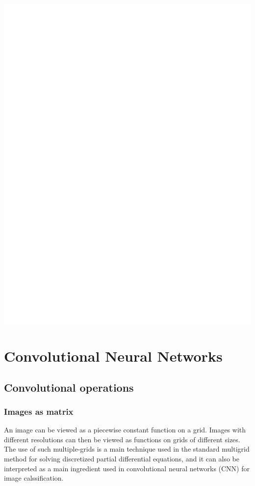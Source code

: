 \documentclass[10pt]{article}
\begin{document}
\includegraphics[max width=\textwidth]{2022_01_06_b5ce182ed1bd5f482e5bg-02}

\section{Convolutional Neural Networks}
\subsection{Convolutional operations}
\subsubsection{Images as matrix}
An image can be viewed as a piecewise constant function on a grid. Images with different resolutions can then be viewed as functions on grids of different sizes. The use of such multiple-grids is a main technique used in the standard multigrid method for solving discretized partial differential equations, and it can also be interpreted as a main ingredient used in convolutional neural networks (CNN) for image calssification.
\end{document}
